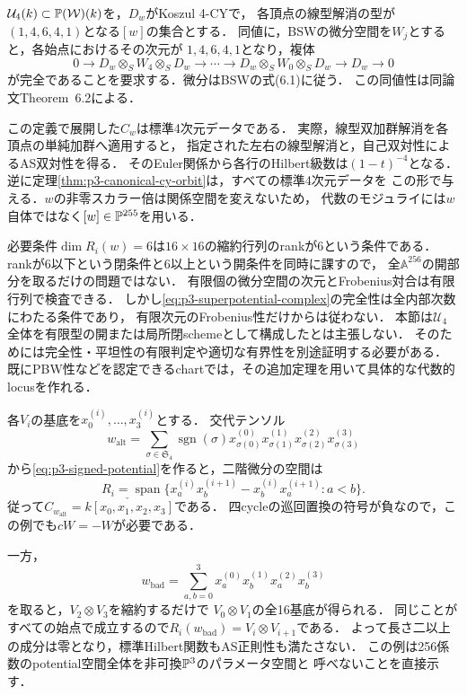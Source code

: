 \begin{definition}[許容potentialの集合]
\label{def:p3-admissible-potentials}
$\mathcal U_4(k)\subset\mathbb P(\mathcal W)(k)$を，$D_w$がKoszul 4-CYで，
各頂点の線型解消の型が$(1,4,6,4,1)$となる$[w]$の集合とする．
同値に，BSWの微分空間を$W_j$とすると，各始点におけるその次元が
$1,4,6,4,1$となり，複体
\begin{equation}\label{eq:p3-superpotential-complex}
 0\longrightarrow D_w\otimes_S W_4\otimes_S D_w
 \longrightarrow\cdots\longrightarrow
 D_w\otimes_S W_0\otimes_S D_w
 \longrightarrow D_w\longrightarrow0
\end{equation}
が完全であることを要求する．微分はBSWの式(6.1)に従う．
この同値性は同論文Theorem~6.2による．
\end{definition}

この定義で展開した$C_w$は標準4次元データである．
実際，線型双加群解消を各頂点の単純加群へ適用すると，
指定された左右の線型解消と，自己双対性によるAS双対性を得る．
そのEuler関係から各行のHilbert級数は$(1-t)^{-4}$となる．
逆に定理\ref{thm:p3-canonical-cy-orbit}は，すべての標準4次元データを
この形で与える．$w$の非零スカラー倍は関係空間を変えないため，
代数のモジュライには$w$自体ではなく$[w]\in\mathbb P^{255}$を用いる．

\begin{remark}[有限係数表示と正則locus]
必要条件$\dim R_i(w)=6$は$16\times16$の縮約行列のrankが6という条件である．
rankが6以下という閉条件と6以上という開条件を同時に課すので，
全$\mathbb A^{256}$の開部分を取るだけの問題ではない．
有限個の微分空間の次元とFrobenius対合は有限行列で検査できる．
しかし\eqref{eq:p3-superpotential-complex}の完全性は全内部次数にわたる条件であり，
有限次元のFrobenius性だけからは従わない．
本節は$\mathcal U_4$全体を有限型の開または局所閉schemeとして構成したとは主張しない．
そのためには完全性・平坦性の有限判定や適切な有界性を別途証明する必要がある．
既にPBW性などを認定できるchartでは，その追加定理を用いて具体的な代数的locusを作れる．
\end{remark}

\begin{remark}[可換例と正則性を満たさないpotential]
\label{ex:p3-potential-examples}
各$V_i$の基底を$x_0^{(i)},\ldots,x_3^{(i)}$とする．
交代テンソル
\[
 w_{\mathrm{alt}}=
 \sum_{\sigma\in\mathfrak S_4}\operatorname{sgn}(\sigma)
 x_{\sigma(0)}^{(0)}x_{\sigma(1)}^{(1)}
 x_{\sigma(2)}^{(2)}x_{\sigma(3)}^{(3)}
\]
から\eqref{eq:p3-signed-potential}を作ると，二階微分の空間は
\[
 R_i=\operatorname{span}
 \{x_a^{(i)}x_b^{(i+1)}-x_b^{(i)}x_a^{(i+1)}:a<b\}.
\]
従って$C_{w_{\mathrm{alt}}}=\check{k[x_0,x_1,x_2,x_3]}$である．
四cycleの巡回置換の符号が負なので，この例でも$cW=-W$が必要である．

一方，
\[
 w_{\mathrm{bad}}=\sum_{a,b=0}^3
 x_a^{(0)}x_b^{(1)}x_a^{(2)}x_b^{(3)}
\]
を取ると，$V_2\otimes V_3$を縮約するだけで
$V_0\otimes V_1$の全16基底が得られる．
同じことがすべての始点で成立するので$R_i(w_{\mathrm{bad}})=V_i\otimes V_{i+1}$である．
よって長さ二以上の成分は零となり，標準Hilbert関数もAS正則性も満たさない．
この例は256係数のpotential空間全体を非可換$\mathbb P^3$のパラメータ空間と
呼べないことを直接示す．
\end{remark}


